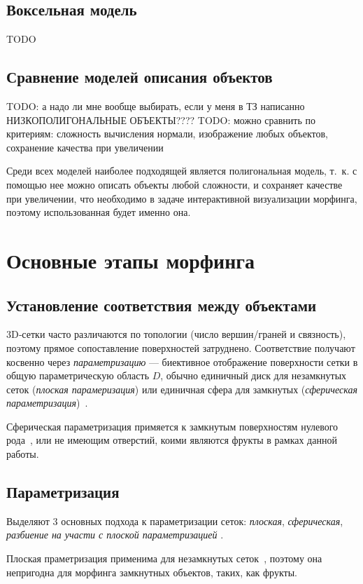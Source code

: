 \subsection{Воксельная модель}
TODO

\subsection{Сравнение моделей описания объектов}
TODO: а надо ли мне вообще выбирать, если у меня в ТЗ написанно НИЗКОПОЛИГОНАЛЬНЫЕ ОБЪЕКТЫ????
TODO: можно сравнить по критериям: сложность вычисления нормали, изображение любых объектов, сохранение качества при увеличении

Среди всех моделей наиболее подходящей является полигональная модель, т.~к. с помощью нее можно описать объекты любой сложности, и сохраняет качестве при увеличении, что необходимо в задаче интерактивной визуализации морфинга,  поэтому использованная будет именно она.


\section{Основные этапы морфинга}

\subsection{Установление соответствия между объектами}
3D‑сетки часто различаются по топологии (число вершин/граней и связность), поэтому прямое сопоставление поверхностей затруднено. Соответствие получают косвенно через \textit{параметризацию} — биективное отображение поверхности сетки в общую параметрическую область $D$, обычно единичный диск для незамкнутых сеток (\textit{плоская парамеризация}) или единичная сфера для замкнутых (\textit{сферическая параметризация})~\cite{mocanu}.

Сферическая параметризация примяется к замкнутым поверхностям нулевого рода~\cite{mocanu}, или не имеющим отверстий, коими являются фрукты в рамках данной работы.

\subsection{Параметризация}

Выделяют 3 основных подхода к параметризации сеток: \textit{плоская}, \textit{сферическая}, \textit{разбиение на участи с плоской параметризацией} \cite{mocanu,alexa}.

Плоская праметризация применима для незамкнутых сеток~\cite{mocanu,alexa}, поэтому она непригодна для морфинга замкнутных объектов, таких, как фрукты.

